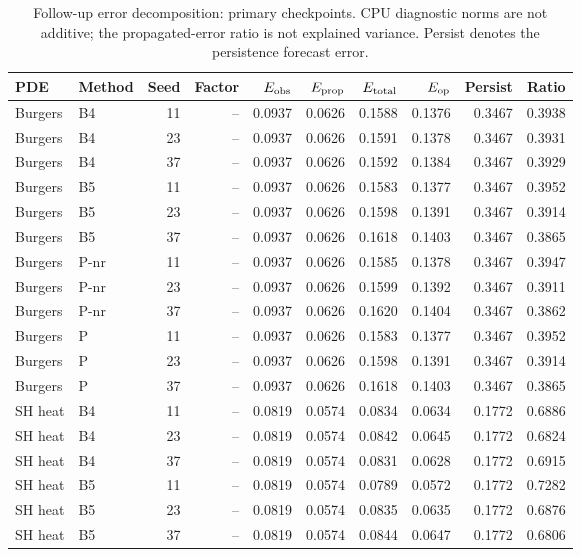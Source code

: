\begin{table}[ht]
\centering\small
\caption{Follow-up error decomposition: primary checkpoints. CPU diagnostic norms are not additive; the propagated-error ratio is not explained variance. Persist denotes the persistence forecast error.}
\begin{tabular}{@{}llrrrrrrrr@{}}\toprule
PDE & Method & Seed & Factor & $E_{\rm obs}$ & $E_{\rm prop}$ & $E_{\rm total}$ & $E_{\rm op}$ & Persist & Ratio\\\midrule
Burgers & B4 & 11 & -- & 0.0937 & 0.0626 & 0.1588 & 0.1376 & 0.3467 & 0.3938\\
Burgers & B4 & 23 & -- & 0.0937 & 0.0626 & 0.1591 & 0.1378 & 0.3467 & 0.3931\\
Burgers & B4 & 37 & -- & 0.0937 & 0.0626 & 0.1592 & 0.1384 & 0.3467 & 0.3929\\
Burgers & B5 & 11 & -- & 0.0937 & 0.0626 & 0.1583 & 0.1377 & 0.3467 & 0.3952\\
Burgers & B5 & 23 & -- & 0.0937 & 0.0626 & 0.1598 & 0.1391 & 0.3467 & 0.3914\\
Burgers & B5 & 37 & -- & 0.0937 & 0.0626 & 0.1618 & 0.1403 & 0.3467 & 0.3865\\
Burgers & P-nr & 11 & -- & 0.0937 & 0.0626 & 0.1585 & 0.1378 & 0.3467 & 0.3947\\
Burgers & P-nr & 23 & -- & 0.0937 & 0.0626 & 0.1599 & 0.1392 & 0.3467 & 0.3911\\
Burgers & P-nr & 37 & -- & 0.0937 & 0.0626 & 0.1620 & 0.1404 & 0.3467 & 0.3862\\
Burgers & P & 11 & -- & 0.0937 & 0.0626 & 0.1583 & 0.1377 & 0.3467 & 0.3952\\
Burgers & P & 23 & -- & 0.0937 & 0.0626 & 0.1598 & 0.1391 & 0.3467 & 0.3914\\
Burgers & P & 37 & -- & 0.0937 & 0.0626 & 0.1618 & 0.1403 & 0.3467 & 0.3865\\
SH heat & B4 & 11 & -- & 0.0819 & 0.0574 & 0.0834 & 0.0634 & 0.1772 & 0.6886\\
SH heat & B4 & 23 & -- & 0.0819 & 0.0574 & 0.0842 & 0.0645 & 0.1772 & 0.6824\\
SH heat & B4 & 37 & -- & 0.0819 & 0.0574 & 0.0831 & 0.0628 & 0.1772 & 0.6915\\
SH heat & B5 & 11 & -- & 0.0819 & 0.0574 & 0.0789 & 0.0572 & 0.1772 & 0.7282\\
SH heat & B5 & 23 & -- & 0.0819 & 0.0574 & 0.0835 & 0.0635 & 0.1772 & 0.6876\\
SH heat & B5 & 37 & -- & 0.0819 & 0.0574 & 0.0844 & 0.0647 & 0.1772 & 0.6806\\

\end{tabular}
\end{table}
